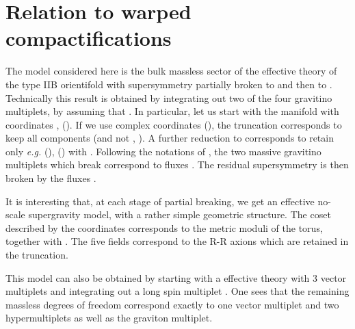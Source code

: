 \documentclass[a4paper,12pt]{article}
\begin{document}
\section{Relation to \coordHE{} warped compactifications}

The model considered here is the bulk massless sector of the effective theory of the type IIB orientifold \cite{fp1,kst}
with \coordHE{} supersymmetry partially broken to \coordHE{} and then to \coordHE{}.
Technically this result is obtained by integrating out two of the four gravitino multiplets, 
by assuming that \coordHE{}.
In particular, let us start with the \coordHE{} manifold with coordinates \coordHE{}, 
\coordHE{} (\coordHE{}). If we use complex coordinates \coordHE{} (\coordHE{}), the \coordHE{}
truncation corresponds to keep all \coordHE{} components (and not \coordHE{}, \coordHE{}).
A further reduction to \coordHE{} corresponds to retain only {\em e.g.}
(\coordHE{}), (\coordHE{}) with \coordHE{}.
Following the notations of \cite{dfv}, the two massive gravitino multiplets which break \coordHE{}
correspond to fluxes \coordHE{}. The residual supersymmetry is then broken \coordHE{} by the 
fluxes \coordHE{}.


It is interesting that, at each stage of partial breaking, we get an effective no-scale supergravity model,
with a rather simple geometric structure.
The coset described by the \coordHE{} coordinates corresponds to the metric moduli of the torus, together with \coordHE{}.
The five fields \coordHE{} correspond to the R-R axions which are retained in the \coordHE{} truncation.

This model can also be obtained by starting with a \coordHE{} effective theory with 3 vector multiplets \cite{fp1}
and integrating out a long \coordHE{} spin \coordHE{} multiplet \coordHE{}.
One sees that the remaining massless degrees of freedom correspond exactly to one vector multiplet and two hypermultiplets 
as well as the \coordHE{} graviton multiplet.
\end{document}
